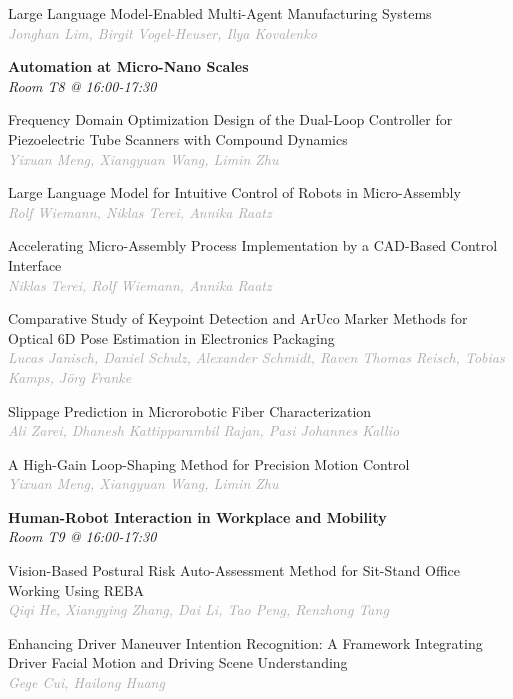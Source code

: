 \begin{multicols*}{2}
\small Large Language Model-Enabled Multi-Agent Manufacturing Systems\\ 
\footnotesize \textcolor{darkgray}{\textit{Jonghan Lim, Birgit  Vogel-Heuser, Ilya  Kovalenko}}

\normalsize \textbf{Automation at Micro-Nano Scales}\\
\small \textit{Room T8 @ 16:00-17:30}

\small Frequency Domain Optimization Design of the Dual-Loop Controller for Piezoelectric Tube Scanners with Compound Dynamics\\ 
\footnotesize \textcolor{darkgray}{\textit{Yixuan Meng, Xiangyuan  Wang, Limin  Zhu}}

\small Large Language Model for Intuitive Control of Robots in Micro-Assembly\\ 
\footnotesize \textcolor{darkgray}{\textit{Rolf Wiemann, Niklas  Terei, Annika  Raatz}}

\small Accelerating Micro-Assembly Process Implementation by a CAD-Based Control Interface\\ 
\footnotesize \textcolor{darkgray}{\textit{Niklas Terei, Rolf  Wiemann, Annika  Raatz}}

\small Comparative Study of Keypoint Detection and ArUco Marker Methods for Optical 6D Pose Estimation in Electronics Packaging\\ 
\footnotesize \textcolor{darkgray}{\textit{Lucas Janisch, Daniel  Schulz, Alexander  Schmidt, Raven Thomas  Reisch, Tobias  Kamps, Jörg  Franke}}

\small Slippage Prediction in Microrobotic Fiber Characterization\\ 
\footnotesize \textcolor{darkgray}{\textit{Ali Zarei, Dhanesh Kattipparambil  Rajan, Pasi Johannes  Kallio}}

\small A High-Gain Loop-Shaping Method for Precision Motion Control\\ 
\footnotesize \textcolor{darkgray}{\textit{Yixuan Meng, Xiangyuan  Wang, Limin  Zhu}}

\normalsize \textbf{Human-Robot Interaction in Workplace and Mobility}\\
\small \textit{Room T9 @ 16:00-17:30}

\small Vision-Based Postural Risk Auto-Assessment Method for Sit-Stand Office Working Using REBA\\ 
\footnotesize \textcolor{darkgray}{\textit{Qiqi He, Xiangying  Zhang, Dai  Li, Tao  Peng, Renzhong  Tang}}

\small Enhancing Driver Maneuver Intention Recognition: A Framework Integrating Driver Facial Motion and Driving Scene Understanding\\ 
\footnotesize \textcolor{darkgray}{\textit{Gege Cui, Hailong  Huang}}


\end{multicols*}
